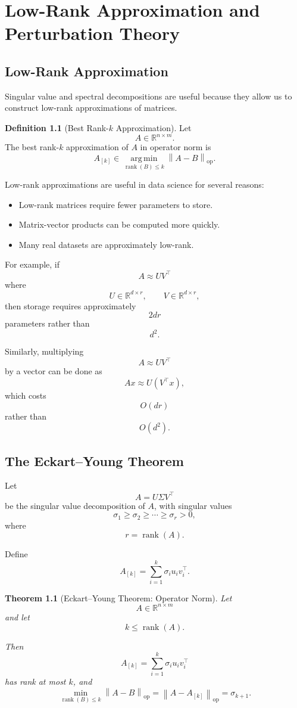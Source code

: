 \documentclass[12pt,oneside]{book}
\numberwithin{equation}{section}
\theoremstyle{definition}
\newtheorem{definition}{Definition}[section]
\theoremstyle{plain}
\newtheorem{theorem}{Theorem}[section]
\theoremstyle{remark}
\newcommand{\R}{\mathbb{R}}
\newcommand{\argmin}{\operatorname*{arg\,min}}
\newcommand{\norm}[1]{\left\lVert #1 \right\rVert}
\newcommand{\rank}{\operatorname{rank}}
\begin{document}
\chapter{Low-Rank Approximation and Perturbation Theory}

\section{Low-Rank Approximation}

Singular value and spectral decompositions are useful because they allow us to construct low-rank approximations of matrices.

\begin{definition}[Best Rank-$k$ Approximation]
Let
\[
A\in\R^{n\times m}.
\]
The best rank-$k$ approximation of $A$ in operator norm is
\[
A_{[k]}
\in
\argmin_{\rank(B)\leq k}
\norm{A-B}_{\mathrm{op}}.
\]
\end{definition}

Low-rank approximations are useful in data science for several reasons:
\begin{itemize}
\item Low-rank matrices require fewer parameters to store.
\item Matrix-vector products can be computed more quickly.
\item Many real datasets are approximately low-rank.
\end{itemize}

For example, if
\[
A\approx UV^\top
\]
where
\[
U\in\R^{d\times r},
\qquad
V\in\R^{d\times r},
\]
then storage requires approximately
\[
2dr
\]
parameters rather than
\[
d^2.
\]

Similarly, multiplying
\[
A\approx UV^\top
\]
by a vector can be done as
\[
Ax\approx U(V^\top x),
\]
which costs
\[
O(dr)
\]
rather than
\[
O(d^2).
\]

\section{The Eckart--Young Theorem}

Let
\[
A=U\Sigma V^\top
\]
be the singular value decomposition of $A$, with singular values
\[
\sigma_1\geq \sigma_2\geq \cdots \geq \sigma_r>0,
\]
where
\[
r=\rank(A).
\]

Define
\[
A_{[k]}
=
\sum_{i=1}^k \sigma_i u_i v_i^\top.
\]

\begin{theorem}[Eckart--Young Theorem: Operator Norm]
Let
\[
A\in\R^{n\times m}
\]
and let
\[
k\leq \rank(A).
\]

Then
\[
A_{[k]}
=
\sum_{i=1}^k \sigma_i u_i v_i^\top
\]
has rank at most $k$, and
\[
\min_{\rank(B)\leq k}
\norm{A-B}_{\mathrm{op}}
=
\norm{A-A_{[k]}}_{\mathrm{op}}
=
\sigma_{k+1}.
\]
\end{theorem}
\end{document}
